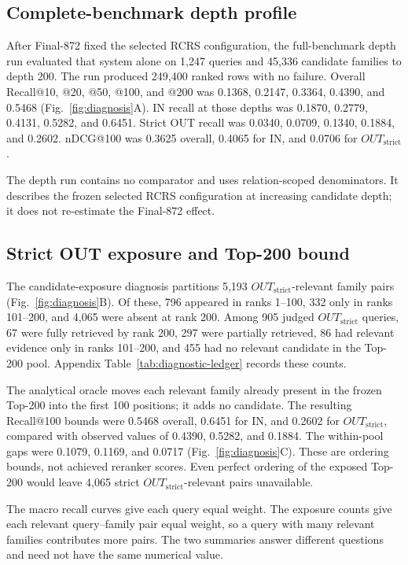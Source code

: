 \documentclass[final,5p,times,twocolumn]{elsarticle}
\begin{document}
\subsection{Complete-benchmark depth profile}

After Final-872 fixed the selected RCRS configuration, the full-benchmark depth run evaluated that
system alone on 1,247 queries and 45,336 candidate families to depth 200. The run
produced 249,400 ranked rows with no failure. Overall Recall@10, @20, @50,
@100, and @200 was 0.1368, 0.2147,
0.3364, 0.4390, and 0.5468 (Fig.~\ref{fig:diagnosis}A). IN recall at those
depths was 0.1870, 0.2779, 0.4131, 0.5282, and 0.6451. Strict OUT recall was
0.0340, 0.0709, 0.1340, 0.1884, and 0.2602. nDCG@100 was 0.3625 overall,
0.4065 for IN, and 0.0706 for \ensuremath{OUT_{\mathrm{strict}}}.

The depth run contains no comparator and uses relation-scoped denominators. It describes
the frozen selected RCRS configuration at increasing candidate depth; it does not re-estimate the
Final-872 effect.

\subsection{Strict OUT exposure and Top-200 bound}

The candidate-exposure diagnosis partitions 5,193 \ensuremath{OUT_{\mathrm{strict}}}-relevant family pairs
(Fig.~\ref{fig:diagnosis}B). Of these, 796 appeared in ranks 1--100, 332 only
in ranks 101--200, and 4,065 were absent at rank 200. Among 905 judged
\ensuremath{OUT_{\mathrm{strict}}}
queries, 67 were fully retrieved by rank 200, 297 were partially retrieved,
86 had relevant evidence only in ranks 101--200, and 455 had no relevant
candidate in the Top-200 pool. Appendix Table~\ref{tab:diagnostic-ledger}
records these counts.

The analytical oracle moves each relevant family already present in the
frozen Top-200 into the first 100 positions; it adds no candidate. The
resulting Recall@100 bounds were 0.5468 overall, 0.6451 for IN, and 0.2602 for
\ensuremath{OUT_{\mathrm{strict}}}, compared with observed values of 0.4390, 0.5282, and 0.1884. The
within-pool gaps were 0.1079, 0.1169, and 0.0717
(Fig.~\ref{fig:diagnosis}C). These are ordering bounds, not achieved reranker
scores. Even perfect ordering of the exposed Top-200 would leave 4,065 strict
\ensuremath{OUT_{\mathrm{strict}}}-relevant pairs unavailable.

The macro recall curves give each query equal weight. The exposure counts give
each relevant query--family pair equal weight, so a query with many relevant
families contributes more pairs. The two summaries answer different questions
and need not have the same numerical value.
\end{document}
